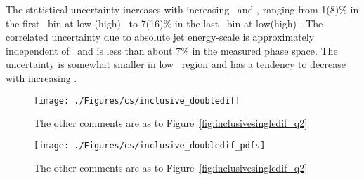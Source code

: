 The statistical uncertainty increases with increasing \etjetb~and \qsq, ranging from 1(8)\% in the first \qsq~bin at low (high) \etjetb~to 7(16)\% in the last \qsq~bin at low(high) \etjetb. The correlated uncertainty due to absolute jet energy-scale is approximately independent of \etjetb~and is less than about 7\% in the measured phase space. The uncertainty is somewhat smaller in low \etjetb~region and has a tendency to decrease with increasing \qsq.
\begin{figure}[p]
	\centering
		\texttt{[image: ./Figures/cs/inclusive\_doubledif]}
	\caption{The other comments are as to Figure~\ref{fig:inclusivesingledif_q2}}
	\label{fig:inclusive_doubledif}
\end{figure}


\begin{figure}[p]
	\centering
		\texttt{[image: ./Figures/cs/inclusive\_doubledif\_pdfs]}
  \caption{The other comments are as to Figure~\ref{fig:inclusivesingledif_q2}}
	\label{fig:inclusive_doubledif_rel}
\end{figure}


